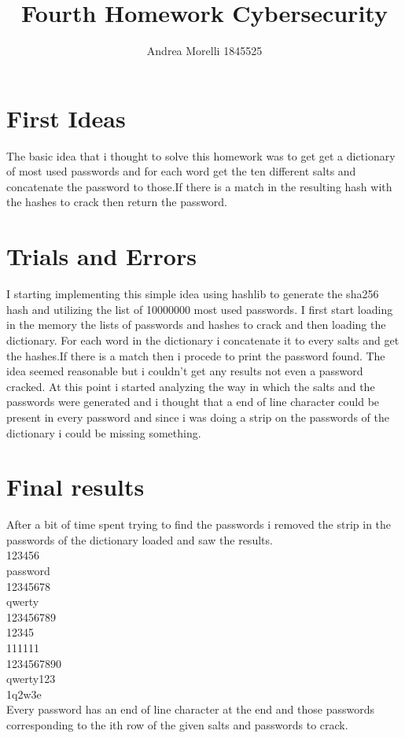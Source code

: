\documentclass{article}
\title{Fourth Homework Cybersecurity}
\author{Andrea Morelli 1845525}
\date{}
\begin{document}
\maketitle

\section{First Ideas}
The basic idea that i thought to solve this homework was to get get a dictionary of most used passwords and for each word get the ten different salts and concatenate the password to those.If there is a match in the resulting hash with the hashes to crack then return the password.
\section{Trials and Errors}
I starting implementing this simple idea using hashlib to generate the sha256 hash and utilizing the list of 10000000 most used passwords.
I first start loading in the memory the lists of passwords and hashes to crack and then loading the dictionary.
For each word in the dictionary i concatenate it to every salts and get the hashes.If there is a match then i procede to print the password found.
The idea seemed reasonable but i couldn't get any results not even a password cracked.
At this point i started analyzing the way in which the salts and the passwords were generated and i thought that a end of line character could be present in every password and since i was doing a strip on the passwords of the dictionary i could be missing something.
\section{Final results}
After a bit of time spent trying to find the passwords i removed the strip in the passwords of the dictionary loaded and saw the results.\\
123456\\
password\\
12345678\\
qwerty\\
123456789\\
12345\\
111111\\
1234567890\\
qwerty123\\
1q2w3e\\
Every password has an end of line character at the end and those passwords corresponding to the ith row of the given salts and passwords to crack.
\end{document}
